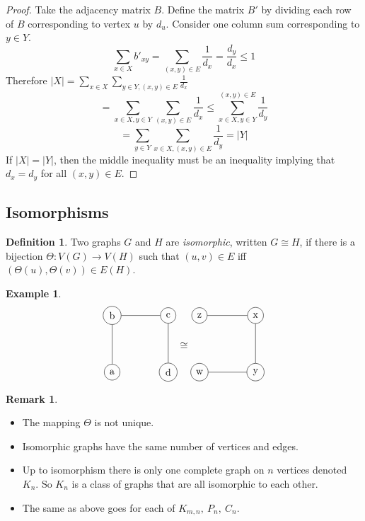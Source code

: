 \documentclass{article}
\theoremstyle{definition}
\newtheorem*{defn}{Definition}
\newtheorem*{ex}{Example}
\newtheorem*{rem}{Remark}
\begin{document}
\begin{proof}
Take the adjacency matrix $B$.
Define the matrix $B'$ by dividing each row of $B$ corresponding to vertex $u$ by $d_u$.
Consider one column sum corresponding to $y\in Y$.
$$\sum_{x\in X} b'_{xy} = \sum_{(x,y)\in E} \frac{1}{d_x} = \frac{d_y}{d_x} \leq 1$$
Therefore $|X|=\sum_{x\in X}\sum_{y\in Y,(x,y)\in E} \frac{1}{d_x}$
$$=\sum_{x\in X, y\in Y}\sum_{(x,y)\in E} \frac{1}{d_x} \leq \sum_{x\in X, y\in Y}^{(x,y)\in E} \frac{1}{d_y}$$
$$=\sum_{y\in Y} \sum_{x\in X,(x,y)\in E} \frac{1}{d_y} = |Y|$$
If $|X|=|Y|$, then the middle inequality must be an inequality implying that $d_x=d_y$ for all $(x,y)\in E$.
\end{proof}

\subsection{Isomorphisms}

\begin{defn}
Two graphs $G$ and $H$ are \emph{isomorphic}, written $G\cong H$, if there is a bijection $\Theta\colon V(G) \to V(H)$ such that $(u,v)\in E$ iff $(\Theta(u),\Theta(v))\in E(H)$.
\end{defn}

\begin{ex}
$$
\begin{tikzpicture}[baseline=5.5ex]
  \node[draw,circle] (G-1) at (0,0) {a};
  \node[draw,circle] (G-2) at (0,2) {b};
  \node[draw,circle] (G-3) at (2,2) {c};
  \node[draw,circle] (G-4) at (2,0) {d};
  \draw (G-1) -- (G-2) -- (G-3) -- (G-4);
\end{tikzpicture}\cong
\begin{tikzpicture}[baseline=5.5ex]
  \node[draw,circle] (G-1) at (0,0) {w};
  \node[draw,circle] (G-2) at (0,2) {z};
  \node[draw,circle] (G-3) at (2,2) {x};
  \node[draw,circle] (G-4) at (2,0) {y};
  \draw (G-1) -- (G-4) -- (G-3) -- (G-2);
\end{tikzpicture}$$
\end{ex}

\begin{rem}
\begin{itemize}
\item The mapping $\Theta$ is not unique.
\item Isomorphic graphs have the same number of vertices and edges.
\item Up to isomorphism there is only one complete graph on $n$ vertices denoted $K_n$.
So $K_n$ is a class of graphs that are all isomorphic to each other.
\item The same as above goes for each of $K_{m,n},\ P_n,\ C_n$.
\end{itemize}
\end{rem}
\end{document}
